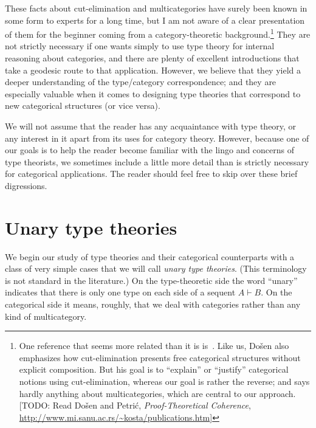 \documentclass{book}
\let\types\vdash
\begin{document}
These facts about cut-elimination and multicategories have surely been known in some form to experts for a long time, but I am not aware of a clear presentation of them for the beginner coming from a category-theoretic background.\footnote{One reference that seems more related than it is is~\cite{dosen:cutelim-cats}.
  Like us, Do\v{s}en also emphasizes how cut-elimination presents free categorical structures without explicit composition.
  But his goal is to ``explain'' or ``justify'' categorical notions using cut-elimination, whereas our goal is rather the reverse; and
  says hardly anything about multicategories, which are central to our approach.
  [TODO: Read Do\v{s}en and Petri\'{c}, \textit{Proof-Theoretical Coherence}, \url{http://www.mi.sanu.ac.rs/~kosta/publications.htm}]}
They are not strictly necessary if one wants simply to use type theory for internal reasoning about categories, and there are plenty of excellent introductions that take a geodesic route to that application.
However, we believe that they yield a deeper understanding of the type/category correspondence; and they are especially valuable when it comes to designing type theories that correspond to new categorical structures (or vice versa).

We will not assume that the reader has any acquaintance with type theory, or any interest in it apart from its uses for category theory.
However, because one of our goals is to help the reader become familiar with the lingo and concerns of type theorists, we sometimes include a little more detail than is strictly necessary for categorical applications.
The reader should feel free to skip over these brief digressions.



\chapter{Unary type theories}
\label{chap:unary}

We begin our study of type theories and their categorical counterparts with a class of very simple cases that we will call \emph{unary type theories}.
(This terminology is not standard in the literature.)
On the type-theoretic side the word ``unary'' indicates that there is only one type on each side of a sequent $A\types B$.
On the categorical side it means, roughly, that we deal with categories rather than any kind of multicategory.
\end{document}
